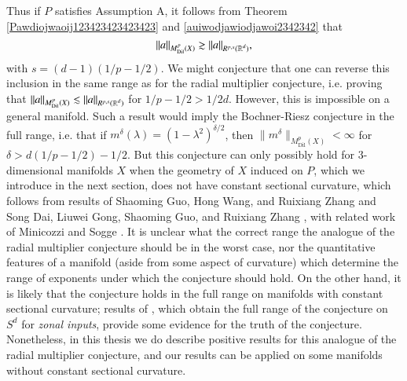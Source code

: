 Thus if $P$ satisfies Assumption A, it follows from Theorem \ref{Pawdiojwaoij123423423423423} and \eqref{auiwodjawiodjawoi2342342} that
%
\begin{equation} \label{upperboundawdoiwjdoawi}
  \| a \|_{M^p_{\text{Dil}}(X)} \gtrsim \| a \|_{R^{p,s}(\operatorname{\mathbb{R}}^d)},
\end{equation}
%
with $s = (d-1)(1/p - 1/2)$. We might conjecture that one can reverse this inclusion in the same range as for the radial multiplier conjecture, i.e. proving that $\| a \|_{M^p_{\text{Dil}}(X)} \lesssim \| a \|_{R^{p,s}(\operatorname{\mathbb{R}}^d)}$ for $1/p - 1/2 > 1/2d$. However, this is impossible on a general manifold. Such a result would imply the Bochner-Riesz conjecture in the full range, i.e. that if $m^\delta(\lambda) = (1 - \lambda^2)^{\delta/2}$, then $\| m^\delta \|_{M^p_{\text{Dil}}(X)} < \infty$ for $\delta > d(1/p - 1/2) - 1/2$. But this conjecture can only possibly hold for $3$-dimensional manifolds $X$ when the geometry of $X$ induced on $P$, which we introduce in the next section, does not have constant sectional curvature, which follows from results of Shaoming Guo, Hong Wang, and Ruixiang Zhang \cite{GuoWangZhang} and Song Dai, Liuwei Gong, Shaoming Guo, and Ruixiang Zhang \cite{DaiGongGuoZhang}, with related work of Minicozzi and Sogge \cite{Minicozzi}. It is unclear what the correct range the analogue of the radial multiplier conjecture should be in the worst case, nor the quantitative features of a manifold (aside from some aspect of curvature) which determine the range of exponents under which the conjecture should hold. On the other hand, it is likely that the conjecture holds in the full range on manifolds with constant sectional curvature; results of \cite{Alladi}, which obtain the full range of the conjecture on $S^d$ for \emph{zonal inputs}, provide some evidence for the truth of the conjecture. Nonetheless, in this thesis we do describe positive results for this analogue of the radial multiplier conjecture, and our results can be applied on some manifolds without constant sectional curvature.

%
%
%
%
%

